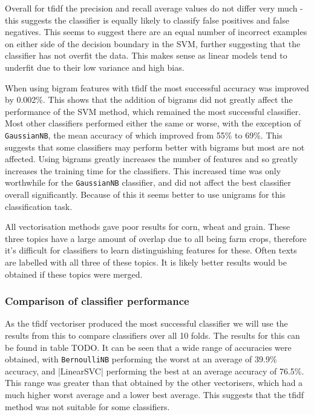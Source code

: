 \documentclass{article}
\begin{document}
Overall for tfidf the precision and recall average values do not differ very much - this suggests the classifier is equally likely to classify false positives and false negatives. This seems to suggest there are an equal number of incorrect examples on either side of the decision boundary in the SVM, further suggesting that the classifier has not overfit the data. This makes sense as linear models tend to underfit due to their low variance and high bias.

When using bigram features with tfidf the most successful accuracy was improved by 0.002\%. This shows that the addition of bigrams did not greatly affect the performance of the SVM method, which remained the most successful classifier. Most other classifiers performed either the same or worse, with the exception of \verb|GaussianNB|, the mean accuracy of which improved from 55\% to 69\%. This suggests that some classifiers may perform better with bigrams but most are not affected. Using bigrams greatly increases the number of features and so greatly increases the training time for the classifiers. This increased time was only worthwhile for the \verb|GaussianNB| classifier, and did not affect the best classifier overall significantly. Because of this it seems better to use unigrams for this classification task.

All vectorisation methods gave poor results for corn, wheat and grain. These three topics have a large amount of overlap due to all being farm crops, therefore it's difficult for classifiers to learn distinguishing features for these. Often texts are labelled with all three of these topics. It is likely better results would be obtained if these topics were merged.

\subsubsection{Comparison of classifier performance}
As the tfidf vectoriser produced the most successful classifier we will use the results from this to compare classifiers over all 10 folds. The results for this can be found in table TODO. It can be seen that a wide range of accuracies were obtained, with \verb|BernoulliNB| performing the worst at an average of 39.9\% accuracy, and |LinearSVC| performing the best at an average accuracy of 76.5\%. This range was greater than that obtained by the other vectorisers, which had a much higher worst average and a lower best average. This suggests that the tfidf method was not suitable for some classifiers.
\end{document}
